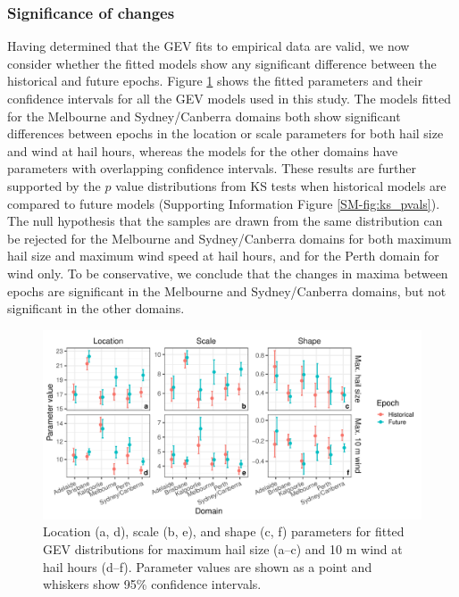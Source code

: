 \documentclass[]{agujournal2019}\usepackage[]{graphicx}\usepackage[]{xcolor}
\begin{document}
\subsubsection{Significance of changes}

Having determined that the GEV fits to empirical data are valid, we now consider whether the fitted models show any significant difference between the historical and future epochs. Figure \ref{fig:gev_parameters} shows the fitted parameters and their confidence intervals for all the GEV models used in this study. The models fitted for the Melbourne and Sydney/Canberra domains both show significant differences between epochs in the location or scale parameters for both hail size and wind at hail hours, whereas the models for the other domains have parameters with overlapping confidence intervals. These results are further supported by the $p$ value distributions from KS tests when historical models are compared to future models (Supporting Information Figure \ref{SM-fig:ks_pvals}). The null hypothesis that the samples are drawn from the same distribution can be rejected for the Melbourne and Sydney/Canberra domains for both maximum hail size and maximum wind speed at hail hours, and for the Perth domain for wind only. To be conservative, we conclude that the changes in maxima between epochs are significant in the Melbourne and Sydney/Canberra domains, but not significant in the other domains.

\begin{figure}[!ht]
      \includegraphics[width=\textwidth]{figures/fit_params}
      \caption{Location (a, d), scale (b, e), and shape (c, f) parameters for fitted GEV distributions for maximum hail size (a--c) and 10 m wind at hail hours (d--f). Parameter values are shown as a point and whiskers show 95\% confidence intervals.}
      \label{fig:gev_parameters}
\end{figure}
\end{document}
